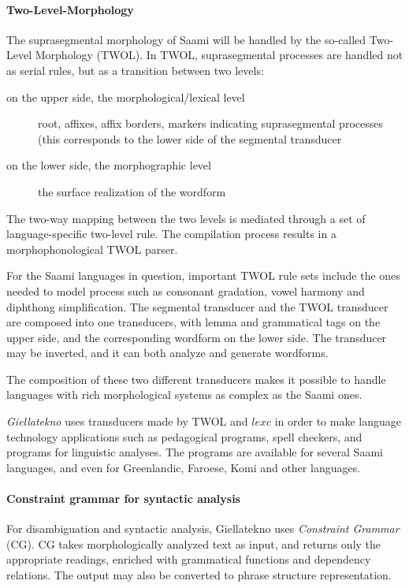 \documentclass[a4paper,12pt]{article}
\begin{document}
\paragraph{Two-Level-Morphology}
The suprasegmental morphology of Saami will be handled by the so-called Two-Level Morphology (TWOL). In TWOL, suprasegmental processes are handled not as serial rules, but as a transition between two levels:
\begin{description}
\item[on the upper side, the morphological/lexical level] root, affixes, affix borders, markers indicating suprasegmental processes (this corresponds to the lower side of the segmental transducer
\item[on the lower side, the morphographic level] the surface realization of the wordform
\end{description}
The two-way mapping between the two levels is mediated through a set of language-specific two-level rule. The compilation process results in a morphophonological TWOL parser.

For the Saami languages in question, important TWOL rule sets include the ones needed to model process such as consonant gradation, vowel harmony and diphthong simplification. The segmental transducer and the TWOL transducer are composed into one transducers, with lemma and grammatical tags on the upper side, and the corresponding wordform on the lower side. The transducer may be inverted, and it can both analyze and generate wordforms.

The composition of these two different transducers makes it possible to handle languages with rich morphological systems as complex as the Saami ones. 

\textit{Giellatekno} uses transducers made by TWOL and $lexc$ in order to make language technology applications such as pedagogical programs, spell checkers, and programs for linguistic analyses. The programs are available for several Saami languages, and even for Greenlandic, Faroese, Komi and other languages.

\paragraph{Constraint grammar for syntactic analysis}
For disambiguation and syntactic analysis, Giellatekno uses \textit{Constraint Grammar} (CG). CG takes morphologically analyzed text as input, and returns only the appropriate readings, enriched with grammatical functions and dependency relations. The output may also be converted to phrase structure representation.
\end{document}
